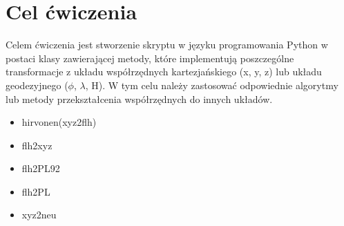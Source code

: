 \section{Cel ćwiczenia}
Celem ćwiczenia jest stworzenie skryptu w języku programowania Python w postaci klasy zawierającej metody, które implementują poszczególne transformacje z układu współrzędnych kartezjańskiego (x, y, z) lub układu geodezyjnego ($\phi$, $\lambda$, H). W tym celu należy zastosować odpowiednie algorytmy lub metody przekształcenia współrzędnych do innych układów.

\begin{itemize}
\item hirvonen(xyz2flh)
\item flh2xyz
\item flh2PL92
\item flh2PL
\item xyz2neu 
	
\end{itemize}